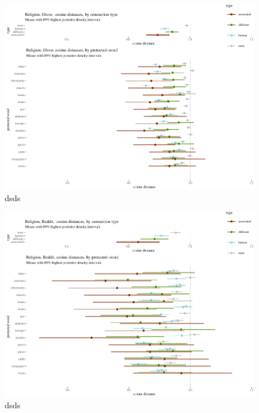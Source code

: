 \documentclass[
  10pt,
  dvipsnames,enabledeprecatedfontcommands]{scrartcl}
\begin{document}
\begin{figure}


\begin{center}\includegraphics[width=1.1\linewidth]{paperDraft6_files/figure-latex/unnamed-chunk-8-1} \end{center}
\caption{dsds}
\label{fig:religionGlove}
\end{figure}

\begin{figure}


\begin{center}\includegraphics[width=1.1\linewidth]{paperDraft6_files/figure-latex/unnamed-chunk-9-1} \end{center}
\caption{dsds}
\label{fig:religionReddit}
\end{figure}
\end{document}
